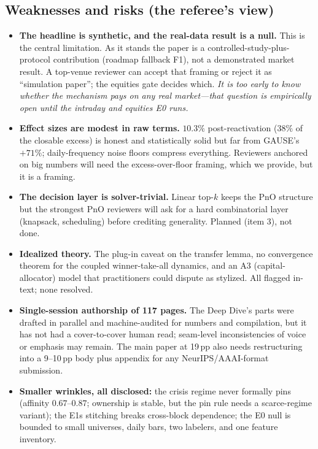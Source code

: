 \documentclass[11pt]{article}
\begin{document}
\subsection{Weaknesses and risks (the referee's view)}
\begin{itemize}
  \item \textbf{The headline is synthetic, and the real-data result is a null.} This is
  the central limitation. As it stands the paper is a controlled-study-plus-protocol
  contribution (roadmap fallback F1), not a demonstrated market result. A top-venue
  reviewer can accept that framing or reject it as ``simulation paper''; the equities
  gate decides which. \emph{It is too early to know whether the mechanism pays on any
  real market---that question is empirically open until the intraday and equities E0
  runs.}
  \item \textbf{Effect sizes are modest in raw terms.} $10.3\%$ post-reactivation
  ($38\%$ of the closable excess) is honest and statistically solid but far from
  GAUSE's $+71\%$; daily-frequency noise floors compress everything. Reviewers
  anchored on big numbers will need the excess-over-floor framing, which we provide,
  but it is a framing.
  \item \textbf{The decision layer is solver-trivial.} Linear top-$k$ keeps the PnO
  structure but the strongest PnO reviewers will ask for a hard combinatorial layer
  (knapsack, scheduling) before crediting generality. Planned (item 3), not done.
  \item \textbf{Idealized theory.} The plug-in caveat on the transfer lemma, no
  convergence theorem for the coupled winner-take-all dynamics, and an A3
  (capital-allocator) model that practitioners could dispute as stylized. All flagged
  in-text; none resolved.
  \item \textbf{Single-session authorship of 117 pages.} The Deep Dive's parts were
  drafted in parallel and machine-audited for numbers and compilation, but it has not
  had a cover-to-cover human read; seam-level inconsistencies of voice or emphasis may
  remain. The main paper at 19\,pp also needs restructuring into a 9--10\,pp body plus
  appendix for any NeurIPS/AAAI-format submission.
  \item \textbf{Smaller wrinkles, all disclosed:} the crisis regime never formally pins
  (affinity $0.67$--$0.87$; ownership is stable, but the pin rule needs a
  scarce-regime variant); the E1s stitching breaks cross-block dependence; the E0 null
  is bounded to small universes, daily bars, two labelers, and one feature inventory.
\end{itemize}
\end{document}
